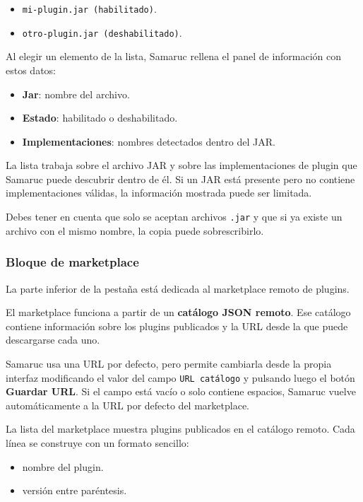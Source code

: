 \documentclass[../../main.tex]{subfiles}
\begin{document}
\begin{itemize}
    \item \texttt{mi-plugin.jar (habilitado)}.
    \item \texttt{otro-plugin.jar (deshabilitado)}.
\end{itemize}

Al elegir un elemento de la lista, Samaruc rellena el panel de información con estos datos:

\begin{itemize}
    \item \textbf{Jar}: nombre del archivo.
    \item \textbf{Estado}: habilitado o deshabilitado.
    \item \textbf{Implementaciones}: nombres detectados dentro del JAR.
\end{itemize}

La lista trabaja sobre el archivo JAR y sobre las implementaciones de plugin que Samaruc puede descubrir dentro de él. Si un JAR está presente pero no contiene implementaciones válidas, la información mostrada puede ser limitada.

Debes tener en cuenta que solo se aceptan archivos \texttt{.jar} y que si ya existe un archivo con el mismo nombre, la copia puede sobrescribirlo.

\subsubsection{Bloque de marketplace}

La parte inferior de la pestaña está dedicada al marketplace remoto de plugins.

El marketplace funciona a partir de un \textbf{catálogo JSON remoto}. Ese catálogo contiene información sobre los plugins publicados y la URL desde la que puede descargarse cada uno.

Samaruc usa una URL por defecto, pero permite cambiarla desde la propia interfaz modificando el valor del campo \texttt{URL catálogo} y pulsando luego el botón \textbf{Guardar URL}. Si el campo está vacío o solo contiene espacios, Samaruc vuelve automáticamente a la URL por defecto del marketplace.

La lista del marketplace muestra plugins publicados en el catálogo remoto. Cada línea se construye con un formato sencillo:

\begin{itemize}
    \item nombre del plugin.
    \item versión entre paréntesis.
\end{itemize}
\end{document}
